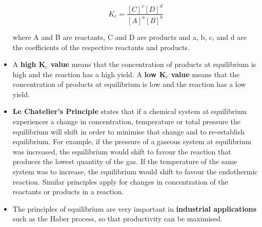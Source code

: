 \begin{itemize}
{\begin{equation*}
K_{c} = \frac{[C]^{c}[D]^{d}}{[A]^{a}[B]^{b}} 
\end{equation*}

where A and B are reactants, C and D are products and a, b, c, and d are the coefficients of the respective reactants and products. }
\item{A \textbf{high K$_{c}$ value} means that the concentration of products at equilibrium is high and the reaction has a high yield. A \textbf{low K$_{c}$ value} means that the concentration of products at equilibrium is low and the reaction has a low yield.}
\item{\textbf{Le Chatelier's Principle} states that if a chemical system at equilibrium experiences a change in concentration, temperature or total pressure the equilibrium will shift in order to minimise that change and to re-establish equilibrium. For example, if the pressure of a gaseous system at equilibrium was increased, the equilibrium would shift to favour the reaction that produces the lowest quantity of the gas. If the temperature of the same system was to increase, the equilibrium would shift to favour the endothermic reaction. Similar principles apply for changes in concentration of the reactants or products in a reaction.}
\item{The principles of equilibrium are very important in \textbf{industrial applications} such as the Haber process, so that productivity can be maximised.}

\end{itemize}


